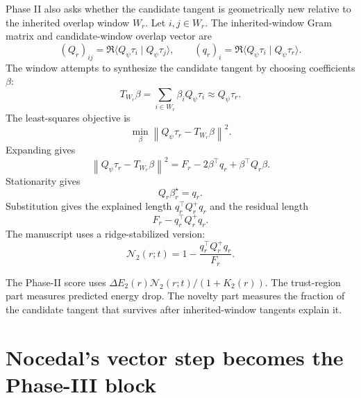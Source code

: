 \documentclass[10pt,twocolumn]{article}
\newcommand{\braket}[2]{\langle #1\mid #2\rangle}
\begin{document}
Phase II also asks whether the candidate tangent is geometrically new relative to the inherited overlap window \(W_r\). Let \(i,j\in W_r\). The inherited-window Gram matrix and candidate-window overlap vector are
\begin{equation}
(Q_r)_{ij}
=\Re\braket{Q_\psi\tau_i}{Q_\psi\tau_j},
\qquad
(q_r)_i
=\Re\braket{Q_\psi\tau_i}{Q_\psi\tau_r}.
\label{eq:Qr_qr_paper}
\end{equation}
The window attempts to synthesize the candidate tangent by choosing coefficients \(\beta\):
\begin{equation}
T_{W_r}\beta=\sum_{i\in W_r}\beta_i Q_\psi\tau_i\approx Q_\psi\tau_r.
\label{eq:window_synthesis}
\end{equation}
The least-squares objective is
\begin{equation}
\min_\beta
\left\|
Q_\psi\tau_r-T_{W_r}\beta
\right\|^2.
\label{eq:window_ls}
\end{equation}
Expanding gives
\begin{equation}
\left\|
Q_\psi\tau_r-T_{W_r}\beta
\right\|^2
=F_r-2\beta^\top q_r+\beta^\top Q_r\beta.
\label{eq:novelty_expand}
\end{equation}
Stationarity gives
\begin{equation}
Q_r\beta_r^\star=q_r.
\label{eq:novelty_normal}
\end{equation}
Substitution gives the explained length \(q_r^\top Q_r^+q_r\) and the residual length
\begin{equation}
F_r-q_r^\top Q_r^+q_r.
\label{eq:novelty_residual}
\end{equation}
The manuscript uses a ridge-stabilized version:
\begin{equation}
\boxed{
\mathcal N_2(r;t)
=1-
\frac{q_r^\top Q_r^+q_r}{F_r}.
}
\label{eq:N2_paper}
\end{equation}

\begin{paperbox}
The Phase-II score uses \(\Delta E_2(r)\mathcal N_2(r;t)/(1+K_2(r))\). The trust-region part measures predicted energy drop. The novelty part measures the fraction of the candidate tangent that survives after inherited-window tangents explain it.
\end{paperbox}

\section{Nocedal's vector step becomes the Phase-III block}
\end{document}
